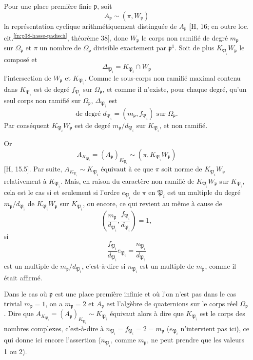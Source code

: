 Pour une place première finie \(\mathfrak p\), soit
\[
        A_{\mathfrak p}\sim(\pi,W_{\mathfrak p})
\]
la représentation cyclique arithmétiquement distinguée de \(A_{\mathfrak p}\) [H, 16; en outre loc. cit.\textsuperscript{\ref{fn:p38-hasse-padisch}}, théorème 38], donc \(W_{\mathfrak p}\) le corps non ramifié de degré \(m_{\mathfrak p}\) sur \(\Omega_{\mathfrak p}\) et \(\pi\) un nombre de \(\Omega_{\mathfrak p}\) divisible exactement par \(\mathfrak p^1\). Soit de plus \(K_{\mathfrak P_i}W_{\mathfrak p}\) le composé et
\[
        \Delta_{\mathfrak P_i}=K_{\mathfrak P_i}\cap W_{\mathfrak p}
\]
l'intersection de \(W_{\mathfrak p}\) et \(K_{\mathfrak P_i}\). Comme le sous-corps non ramifié maximal contenu dans \(K_{\mathfrak P_i}\) est de degré \(f_{\mathfrak P_i}\) sur \(\Omega_{\mathfrak p}\), et comme il n'existe, pour chaque degré, qu'un seul corps non ramifié sur \(\Omega_{\mathfrak p}\), \(\Delta_{\mathfrak P_i}\) est
\[
        \text{de degré }d_{\mathfrak P_i}=(m_{\mathfrak p},f_{\mathfrak P_i})\text{ sur }\Omega_{\mathfrak p}.
\]
Par conséquent \(K_{\mathfrak P_i}W_{\mathfrak p}\) est de degré \(m_{\mathfrak p}/d_{\mathfrak P_i}\) sur \(K_{\mathfrak P_i}\), et non ramifié.

Or
\[
        A_{K_{\mathfrak P_i}}=(A_{\mathfrak p})_{K_{\mathfrak P_i}}\sim(\pi,K_{\mathfrak P_i}W_{\mathfrak p})
\]
[H, 15.5]. Par suite, \(A_{K_{\mathfrak P_i}}\sim K_{\mathfrak P_i}\) équivaut à ce que \(\pi\) soit norme de \(K_{\mathfrak P_i}W_{\mathfrak p}\) relativement à \(K_{\mathfrak P_i}\). Mais, en raison du caractère non ramifié de \(K_{\mathfrak P_i}W_{\mathfrak p}\) sur \(K_{\mathfrak P_i}\), cela est le cas si et seulement si l'ordre \(e_{\mathfrak P_i}\) de \(\pi\) en \(\mathfrak P_i\) est un multiple du degré \(m_{\mathfrak p}/d_{\mathfrak P_i}\) de \(K_{\mathfrak P_i}W_{\mathfrak p}\) sur \(K_{\mathfrak P_i}\), ou encore, ce qui revient au même à cause de
\[
\left(\frac{m_{\mathfrak p}}{d_{\mathfrak P_i}},\frac{f_{\mathfrak P_i}}{d_{\mathfrak P_i}}\right)=1,
\]
si
\[
\frac{f_{\mathfrak P_i}}{d_{\mathfrak P_i}}e_{\mathfrak P_i}=\frac{n_{\mathfrak P_i}}{d_{\mathfrak P_i}}
\]
est un multiple de \(m_{\mathfrak p}/d_{\mathfrak P_i}\), c'est-à-dire si \(n_{\mathfrak P_i}\) est un multiple de \(m_{\mathfrak p}\), comme il était affirmé.

Dans le cas où \(\mathfrak p\) est une place première infinie et où l'on n'est pas dans le cas trivial \(m_{\mathfrak p}=1\), on a \(m_{\mathfrak p}=2\) et \(A_{\mathfrak p}\) est l'algèbre de quaternions sur le corps réel \(\Omega_{\mathfrak p}\). Dire que \(A_{K_{\mathfrak P_i}}=(A_{\mathfrak p})_{K_{\mathfrak P_i}}\sim K_{\mathfrak P_i}\) équivaut alors à dire que \(K_{\mathfrak P_i}\) est le corps des nombres complexes, c'est-à-dire à \(n_{\mathfrak P_i}=f_{\mathfrak P_i}=2=m_{\mathfrak p}\) (\(e_{\mathfrak P_i}\) n'intervient pas ici), ce qui donne ici encore l'assertion (\(n_{\mathfrak P_i}\), comme \(m_{\mathfrak p}\), ne peut prendre que les valeurs 1 ou 2).

